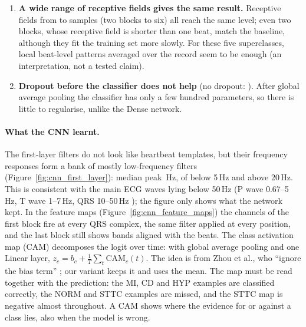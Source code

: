 \begin{enumerate}[leftmargin=1.4em,itemsep=2pt]
        those in which He et al.\ observed degradation.
  \item \textbf{A wide range of receptive fields gives the same result.} Receptive fields from
        \cnnRfSamplesDepthTwo{} to \cnnRfSamplesDepthSix{} samples (two blocks to six) all reach the
        same level; even two blocks, whose receptive field is shorter than one beat, match the
        baseline, although they fit the training set more slowly. For these five superclasses, local
        beat-level patterns averaged over the record seem to be enough (an interpretation, not a
        tested claim).
  \item \textbf{Dropout before the classifier does not help} (no dropout: \cnnDiffMeanNoDropout{}).
        After global average pooling the classifier has only a few hundred parameters, so there is
        little to regularise, unlike the Dense network.
\end{enumerate}

\paragraph{What the CNN learnt.} The first-layer filters do not look like heartbeat templates, but
their frequency responses form a bank of mostly low-frequency filters (Figure~\ref{fig:cnn_first_layer}):
median peak \onedec{\cnnFirstLayerPeakHzMedian}\,Hz, \cnnFirstLayerNPeakBelowFiveHz{} of
\cnnFirstLayerNFilters{} below 5\,Hz and \cnnFirstLayerNPeakAboveTwoZeroHz{} above 20\,Hz. This is
consistent with the main ECG waves lying below 50\,Hz (P wave 0.67--5\,Hz, T wave 1--7\,Hz, QRS
10--50\,Hz \cite[p.~12]{adam2025comparative}); the figure only shows what the network kept. In the
feature maps (Figure~\ref{fig:cnn_feature_maps}) the channels of the first block fire at every QRS
complex, the same filter applied at every position, and the last block still shows bands aligned with
the beats. The class activation map (CAM) decomposes the logit over time: with global average pooling
and one Linear layer, $z_c = b_c + \frac{1}{T}\sum_t \mathrm{CAM}_c(t)$. The idea is from Zhou et al.,
who ``ignore the bias term'' \cite[pp.~2--3]{zhou2016learning}; our variant keeps it and uses the mean.
The map must be read together with the prediction: the MI, CD and HYP examples are classified
correctly, the NORM and STTC examples are missed, and the STTC map is negative almost throughout. A
CAM shows where the evidence for or against a class lies, also when the model is wrong.




